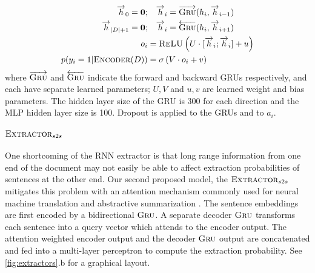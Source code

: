 \newcommand{\rExtHidden}{\overrightarrow{h}}
\newcommand{\lExtHidden}{\overrightarrow{h}}
\newcommand{\docSize}{|\doc|}
\newcommand{\logits}{o}

\begin{align}
    \rExtHidden_0 = \mathbf{0};&\quad   \rExtHidden_i = \rgru(\semb_i, \rExtHidden_{i-1}) \\
    \lExtHidden_{\docSize + 1} = \mathbf{0};&\quad    \lExtHidden_i = \lgru(\semb_i, \lExtHidden_{i+1}) \\
   \logits_i &= \relu\left(U \cdot [\rExtHidden_i; \lExtHidden_i] + u \right)\\
    p(\lbl_i=1|\encoder(\doc)) &= \sigma\left(V\cdot \logits_i + v  \right)
\end{align}
where $\overrightarrow{\textsc{Gru}}$ and $\overleftarrow{\textsc{Gru}}$ indicate the 
forward and backward GRUs respectively, and each have separate learned 
parameters; $U, V$ and $u, v$ are learned weight and bias parameters.
The hidden layer size of the GRU is 300 for each direction and the MLP hidden layer
size is 100. Dropout is applied to the GRUs and to $a_i$.





\paragraph{$\textsc{Extractor}_{s2s}$} One shortcoming of the RNN extractor is that long range
information from one end of the document may not easily be able to affect 
extraction probabilities of sentences at the other end. 
Our second proposed model, the $\textsc{Extractor}_{s2s}$ mitigates this problem with an 
attention 
mechanism commonly
used for neural machine translation \cite{bahdanau2014neural} and 
abstractive summarization \cite{see2017get}. 
The sentence embeddings are first
encoded by a bidirectional $\textsc{Gru}$. A separate decoder $\textsc{Gru}$ transforms each 
sentence into a query vector which attends to the encoder output. The
attention weighted encoder output and the decoder $\textsc{Gru}$ output are concatenated
and fed into a multi-layer perceptron to compute the extraction probability.
See \autoref{fig:extractors}.b for a graphical layout.

